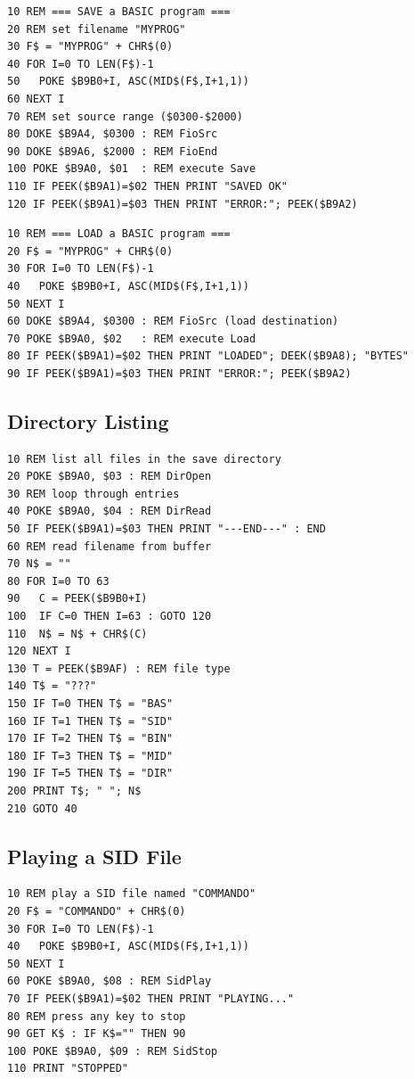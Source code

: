 \begin{lstlisting}
10 REM === SAVE a BASIC program ===
20 REM set filename "MYPROG"
30 F$ = "MYPROG" + CHR$(0)
40 FOR I=0 TO LEN(F$)-1
50   POKE $B9B0+I, ASC(MID$(F$,I+1,1))
60 NEXT I
70 REM set source range ($0300-$2000)
80 DOKE $B9A4, $0300 : REM FioSrc
90 DOKE $B9A6, $2000 : REM FioEnd
100 POKE $B9A0, $01  : REM execute Save
110 IF PEEK($B9A1)=$02 THEN PRINT "SAVED OK"
120 IF PEEK($B9A1)=$03 THEN PRINT "ERROR:"; PEEK($B9A2)
\end{lstlisting}

\begin{lstlisting}
10 REM === LOAD a BASIC program ===
20 F$ = "MYPROG" + CHR$(0)
30 FOR I=0 TO LEN(F$)-1
40   POKE $B9B0+I, ASC(MID$(F$,I+1,1))
50 NEXT I
60 DOKE $B9A4, $0300 : REM FioSrc (load destination)
70 POKE $B9A0, $02   : REM execute Load
80 IF PEEK($B9A1)=$02 THEN PRINT "LOADED"; DEEK($B9A8); "BYTES"
90 IF PEEK($B9A1)=$03 THEN PRINT "ERROR:"; PEEK($B9A2)
\end{lstlisting}

\subsection{Directory Listing}

\begin{lstlisting}
10 REM list all files in the save directory
20 POKE $B9A0, $03 : REM DirOpen
30 REM loop through entries
40 POKE $B9A0, $04 : REM DirRead
50 IF PEEK($B9A1)=$03 THEN PRINT "---END---" : END
60 REM read filename from buffer
70 N$ = ""
80 FOR I=0 TO 63
90   C = PEEK($B9B0+I)
100  IF C=0 THEN I=63 : GOTO 120
110  N$ = N$ + CHR$(C)
120 NEXT I
130 T = PEEK($B9AF) : REM file type
140 T$ = "???"
150 IF T=0 THEN T$ = "BAS"
160 IF T=1 THEN T$ = "SID"
170 IF T=2 THEN T$ = "BIN"
180 IF T=3 THEN T$ = "MID"
190 IF T=5 THEN T$ = "DIR"
200 PRINT T$; " "; N$
210 GOTO 40
\end{lstlisting}

\subsection{Playing a SID File}

\begin{lstlisting}
10 REM play a SID file named "COMMANDO"
20 F$ = "COMMANDO" + CHR$(0)
30 FOR I=0 TO LEN(F$)-1
40   POKE $B9B0+I, ASC(MID$(F$,I+1,1))
50 NEXT I
60 POKE $B9A0, $08 : REM SidPlay
70 IF PEEK($B9A1)=$02 THEN PRINT "PLAYING..."
80 REM press any key to stop
90 GET K$ : IF K$="" THEN 90
100 POKE $B9A0, $09 : REM SidStop
110 PRINT "STOPPED"
\end{lstlisting}

